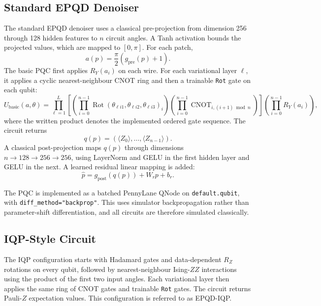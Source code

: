 \subsection{Standard EPQD Denoiser}
The standard EPQD denoiser uses a classical pre-projection from dimension 256 through 128 hidden features to $n$ circuit angles. A Tanh activation bounds the projected values, which are mapped to $[0,\pi]$. For each patch,
\begin{equation}
    a(p)=\frac{\pi}{2}\left(g_{\mathrm{pre}}(p)+1\right).
\end{equation}
The basic PQC first applies $R_Y(a_i)$ on each wire. For each variational layer $\ell$, it applies a cyclic nearest-neighbour CNOT ring and then a trainable \texttt{Rot} gate on each qubit:
\begin{equation}
    U_{\mathrm{basic}}(a,\theta)=
    \prod_{\ell=1}^{L}
    \left[
       \left(\prod_{i=0}^{n-1}\operatorname{Rot}
       (\theta_{\ell i1},\theta_{\ell i2},\theta_{\ell i3})_i\right)
       \left(\prod_{i=0}^{n-1}\operatorname{CNOT}_{i,(i+1)\bmod n}\right)
    \right]
    \left(\prod_{i=0}^{n-1}R_Y(a_i)\right),
\end{equation}
where the written product denotes the implemented ordered gate sequence. The circuit returns
\begin{equation}
    q(p)=\left(\langle Z_0\rangle,\ldots,\langle Z_{n-1}\rangle\right).
\end{equation}
A classical post-projection maps $q(p)$ through dimensions $n\rightarrow128\rightarrow256\rightarrow256$, using LayerNorm and GELU in the first hidden layer and GELU in the next. A learned residual linear mapping is added:
\begin{equation}
    \hat p=g_{\mathrm{post}}(q(p))+W_rp+b_r.
\end{equation}

The PQC is implemented as a batched PennyLane QNode on \texttt{default.qubit}, with \texttt{diff\_method="backprop"}. This uses simulator backpropagation rather than parameter-shift differentiation, and all circuits are therefore simulated classically.

\subsection{IQP-Style Circuit}
The IQP configuration starts with Hadamard gates and data-dependent $R_Z$ rotations on every qubit, followed by nearest-neighbour Ising-$ZZ$ interactions using the product of the first two input angles. Each variational layer then applies the same ring of CNOT gates and trainable \texttt{Rot} gates. The circuit returns Pauli-$Z$ expectation values. This configuration is referred to as EPQD-IQP.

